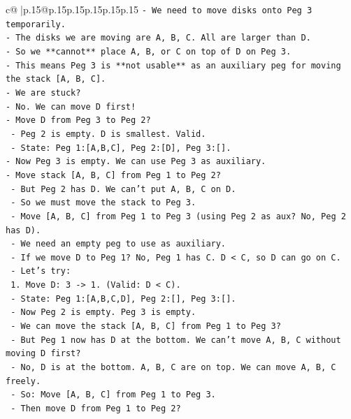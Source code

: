 \documentclass{article}
\begin{document}
{\begin{supertabular}{c@{$\;$}|p{.15\linewidth}@{}p{.15\linewidth}p{.15\linewidth}p{.15\linewidth}p{.15\linewidth}p{.15\linewidth}}
{{{\texttt{{-} We need to move disks onto Peg 3 temporarily.} \\
\texttt{{-} The disks we are moving are A, B, C. All are larger than D.} \\
\texttt{{-} So we **cannot** place A, B, or C on top of D on Peg 3.} \\
\texttt{{-} This means Peg 3 is **not usable** as an auxiliary peg for moving the stack {[}A, B, C{]}.} \\
\texttt{{-} We are stuck?} \\
\texttt{{-} No. We can move D first!} \\
\texttt{{-} Move D from Peg 3 to Peg 2?} \\
\texttt{  {-} Peg 2 is empty. D is smallest. Valid.} \\
\texttt{  {-} State: Peg 1:{[}A,B,C{]}, Peg 2:{[}D{]}, Peg 3:{[}{]}.} \\
\texttt{{-} Now Peg 3 is empty. We can use Peg 3 as auxiliary.} \\
\texttt{{-} Move stack {[}A, B, C{]} from Peg 1 to Peg 2?} \\
\texttt{  {-} But Peg 2 has D. We can't put A, B, C on D.} \\
\texttt{  {-} So we must move the stack to Peg 3.} \\
\texttt{  {-} Move {[}A, B, C{]} from Peg 1 to Peg 3 (using Peg 2 as aux? No, Peg 2 has D).} \\
\texttt{  {-} We need an empty peg to use as auxiliary.} \\
\texttt{  {-} If we move D to Peg 1? No, Peg 1 has C. D < C, so D can go on C.} \\
\texttt{  {-} Let's try:} \\
\texttt{    1. Move D: 3 {-}> 1. (Valid: D < C).} \\
\texttt{       {-} State: Peg 1:{[}A,B,C,D{]}, Peg 2:{[}{]}, Peg 3:{[}{]}.} \\
\texttt{       {-} Now Peg 2 is empty. Peg 3 is empty.} \\
\texttt{       {-} We can move the stack {[}A, B, C{]} from Peg 1 to Peg 3?} \\
\texttt{       {-} But Peg 1 now has D at the bottom. We can't move A, B, C without moving D first?} \\
\texttt{       {-} No, D is at the bottom. A, B, C are on top. We can move A, B, C freely.} \\
\texttt{       {-} So: Move {[}A, B, C{]} from Peg 1 to Peg 3.} \\
\texttt{       {-} Then move D from Peg 1 to Peg 2?} \\
}}}
\end{supertabular}}
\end{document}
